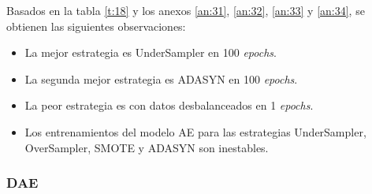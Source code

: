 Basados en la tabla \ref{t:18} y los anexos \ref{an:31}, \ref{an:32}, \ref{an:33} y \ref{an:34}, se obtienen las siguientes observaciones:
\begin{itemize}
	\item La mejor estrategia es UnderSampler en 100 \textit{epochs}.
	\item La segunda mejor estrategia es ADASYN en 100 \textit{epochs}.
	\item La peor estrategia es con datos desbalanceados en 1 \textit{epochs}.
	\item Los entrenamientos del modelo AE para las estrategias UnderSampler, OverSampler, SMOTE y ADASYN son inestables.
\end{itemize}

\subsubsection{DAE}
